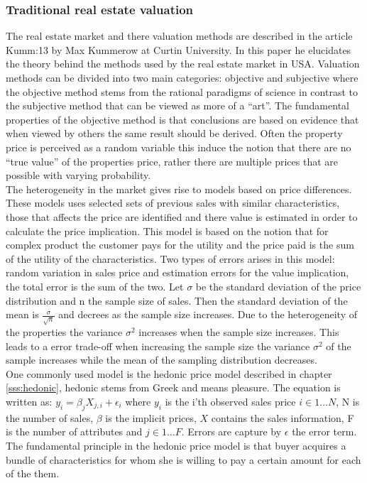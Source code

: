 \subsubsection{Traditional real estate valuation} \label{sss:traditional_valuation}
The real estate market and there valuation methods are described in the article \cite{art}{Kumm:13} by Max Kummerow at Curtin University. In this paper he elucidates the theory behind the methods used by the real estate market in USA. Valuation methods can be divided into two main categories: objective and subjective where the objective method stems from the rational paradigms of science in contrast to the subjective method that can be viewed as more of a ``art''. The fundamental properties of the objective method is that conclusions are based on evidence that when viewed by others the same result should be derived. Often the property price is perceived as a random variable this induce the notion that there are no ``true value'' of the properties price, rather there are multiple prices that are possible with varying probability.   
\\
The heterogeneity in the market gives rise to models based on price differences. These models uses selected sets of previous sales with similar characteristics, those that affects the price are identified and there value is estimated in order to calculate the price implication. This model is based on the notion that for complex product the customer pays for the utility and the price paid is the sum of the utility of the characteristics. Two types of errors arises in this model: random variation in sales price and estimation errors for the value implication, the total error is the sum of the two. Let $\sigma$ be the standard deviation of the price distribution and n the sample size of sales. Then the standard deviation of the mean is $\frac{\sigma}{\sqrt{n}}$ and decrees as the sample size increases. Due to the heterogeneity of the properties the variance $\sigma^{2}$ increases when the sample size increases. This leads to a error trade-off when increasing the sample size the variance $\sigma^{2}$ of the sample increases while the mean of the sampling distribution decreases.
\\
One commonly used model is the hedonic price model described in chapter \ref{sss:hedonic}, hedonic stems from Greek and means pleasure. The equation is written as: $y_{i} = \beta_{j} X_{j,i}  + \epsilon_{i}$ where 
$y_{i}$ is the i'th observed sales price $i \in 1 \ldots N$, N is the number of sales, $\beta$ is the implicit prices, $X$ contains the sales information, F is the number of attributes and $j \in 1 \ldots F$. Errors are capture by $\epsilon$ the error term. The fundamental principle in the hedonic price model is that buyer acquires a bundle of characteristics for whom she is willing to pay a certain amount for each of the them.
